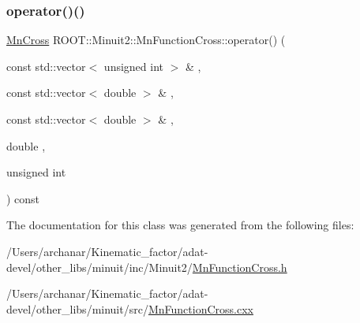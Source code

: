 \subsubsection{\texorpdfstring{operator()()}{operator()()}\hspace{0.1cm}{\footnotesize\ttfamily [3/3]}}
{\footnotesize\ttfamily \mbox{\hyperlink{classROOT_1_1Minuit2_1_1MnCross}{Mn\+Cross}} R\+O\+O\+T\+::\+Minuit2\+::\+Mn\+Function\+Cross\+::operator() (\begin{DoxyParamCaption}\item[{const std\+::vector$<$ unsigned int $>$ \&}]{,  }\item[{const std\+::vector$<$ double $>$ \&}]{,  }\item[{const std\+::vector$<$ double $>$ \&}]{,  }\item[{double}]{,  }\item[{unsigned int}]{ }\end{DoxyParamCaption}) const}



The documentation for this class was generated from the following files\+:\begin{DoxyCompactItemize}
\item 
/\+Users/archanar/\+Kinematic\+\_\+factor/adat-\/devel/other\+\_\+libs/minuit/inc/\+Minuit2/\mbox{\hyperlink{adat-devel_2other__libs_2minuit_2inc_2Minuit2_2MnFunctionCross_8h}{Mn\+Function\+Cross.\+h}}\item 
/\+Users/archanar/\+Kinematic\+\_\+factor/adat-\/devel/other\+\_\+libs/minuit/src/\mbox{\hyperlink{adat-devel_2other__libs_2minuit_2src_2MnFunctionCross_8cxx}{Mn\+Function\+Cross.\+cxx}}\end{DoxyCompactItemize}

